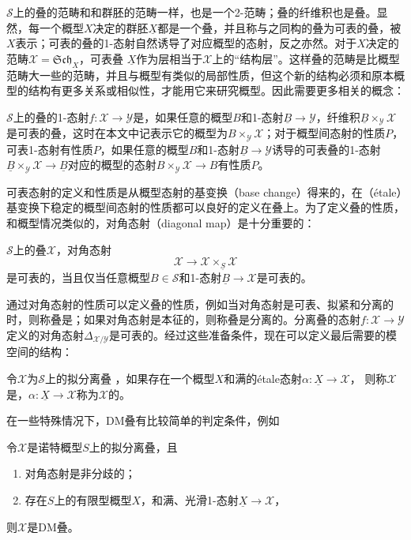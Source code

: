 $ \mathscr{S} $上的叠的范畴和和群胚的范畴一样，也是一个2-范畴；叠的纤维积也是叠。显然，每一个概型$ X $决定的群胚$ \underline{X} $都是一个叠，并且称与之同构的叠为可表的叠，被$ X $表示；可表的叠的1-态射自然诱导了对应概型的态射，反之亦然。对于$ X $决定的范畴$ \mathscr{X}=\mathfrak{Sch}_X $，可表叠 $ \underline{X} $作为层相当于$ \mathscr{X} $上的“结构层”。这样叠的范畴是比概型范畴大一些的范畴，并且与概型有类似的局部性质，但这个新的结构必须和原本概型的结构有更多关系或相似性，才能用它来研究概型。因此需要更多相关的概念：
\begin{definition}
	$ \mathscr{S} $上的叠的1-态射$ f:\mathscr{X}\to \mathscr{Y} $是，如果任意的概型$ B $和1-态射$ \underline{B}\to \mathscr{Y} $，纤维积$ \underline{B}\times_{\mathscr{Y}}\mathscr{X} $是可表的叠，这时在本文中记表示它的概型为$ B\times_{\mathscr{Y}}\mathscr{X} $；对于概型间态射的性质$ P $，可表1-态射有性质$ P $，如果任意的概型$ B $和1-态射$ \underline{B}\to \mathscr{Y} $诱导的可表叠的1-态射$  \underline{B}\times_{\mathscr{Y}}\mathscr{X}\to \underline{B} $对应的概型的态射$ B\times_{\mathscr{Y}}\mathscr{X}\to B $有性质$ P $。
\end{definition}
可表态射的定义和性质是从概型态射的基变换（base change）得来的，在（\'etale）基变换下稳定的概型间态射的性质都可以良好的定义在叠上。为了定义叠的性质，和概型情况类似的，对角态射（diagonal map）是十分重要的：
\begin{lemma}[\cite{GeometryAlgCurvesII}\uppercase\expandafter{\romannumeral12}.Lemma8.1]
	$ \mathscr{S} $上的叠$ \mathscr{X} $，对角态射
	$$ \mathscr{X}\to \mathscr{X}\times_{\underline{S}}\mathscr{X} $$
	是可表的，当且仅当任意概型$ B\in\mathscr{S} $和1-态射$ \underline{B}\to \mathscr{X} $是可表的。
\end{lemma}
通过对角态射的性质可以定义叠的性质，例如当对角态射是可表、拟紧和分离的时，则称叠是；如果对角态射是本征的，则称叠是分离的。分离叠的态射$ f: \mathscr{X}\to \mathscr{Y}$定义的对角态射$ \Delta_{\mathscr{X}/\mathscr{Y}} $是可表的。经过这些准备条件，现在可以定义最后需要的模空间的结构：
\begin{definition}
	令$ \mathscr{X}$为$\mathscr{S} $上的拟分离叠 ，如果存在一个概型$ X $和满的\'etale态射$ \alpha:\underline{X}\to \mathscr{X} $，
	则称$ \mathscr{X} $是，$\alpha: \underline{X}\to \mathscr{X} $称为$ \mathscr{X} $的。
\end{definition}
在一些特殊情况下，DM叠有比较简单的判定条件，例如
\begin{theorem}\label{criterionforDM}
	令$ \mathscr{X} $是诺特概型$ S $上的拟分离叠，且
	\begin{enumerate}
		\item 对角态射是非分歧的；
		\item 存在$ S $上的有限型概型$ X $，和满、光滑1-态射$ \underline{X}\to \mathscr{X} $，
	\end{enumerate}
	则$ \mathscr{X} $是DM叠。
\end{theorem}

